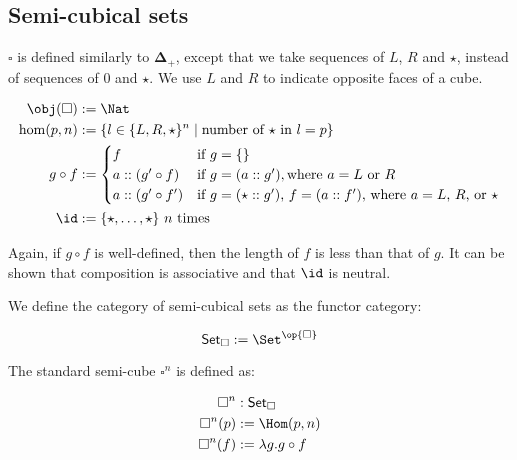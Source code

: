 \documentclass[10pt]{art.cls/art}
\newcommand{\DeltaPlus}{\ensuremath{\boldsymbol{\Delta}_+}}
\newcommand{\Cube}{\ensuremath{\boldsymbol{\square}}}
\newcommand{\CSet}{\ensuremath{\mathsf{Set}_{\boldsymbol{\square}}}}
\newcommand{\kstar}{{\star}}
\begin{document}
\subsection{Semi-cubical sets}
\begin{definition}[\Cube]
  $\Cube$ is defined similarly to $\DeltaPlus$, except that we take sequences of $L$, $R$ and $\star$, instead of sequences of $0$ and $\kstar$. We use $L$ and $R$ to indicate opposite faces of a cube.

  \begin{align*}
    \obj(\Cube) & := \Nat                                                                                \\
    \hom(p, n)  & := \{l \in \{L, R, \kstar\}^n \mid \text{number of $\kstar$ in $l = p$}\}              \\
    g \circ f   & :=
    \begin{cases}
      f                  & \text{if $g = \{\}$}                                                            \\
      a :: (g' \circ f)  & \text{if $g = (a :: g')$}, \text{where $a = L$ or $R$}                          \\
      a :: (g' \circ f') & \text{if $g = (\star :: g')$, $f = (a :: f')$, where $a = L$, $R$, or $\kstar$} \\
    \end{cases} \\
    \id         & := \{\kstar, \ldots, \kstar\} \text{ $n$ times}
  \end{align*}

  Again, if $g \circ f$ is well-defined, then the length of $f$ is less than that of $g$. It can be shown that composition is associative and that $\id$ is neutral.
\end{definition}

\begin{definition}[\CSet]
  We define the category of semi-cubical sets as the functor category:

  \begin{equation*}
    \CSet := \Set^{\op{\Cube}}
  \end{equation*}
\end{definition}

\begin{definition}[$\Cube^n$]
  The standard semi-cube $\Cube^n$ is defined as:

  \begin{align*}
    \Cube^n    & : \CSet                  \\
    \Cube^n(p) & := \Hom(p, n)            \\
    \Cube^n(f) & := \lambda g . g \circ f
  \end{align*}
\end{definition}
\end{document}
